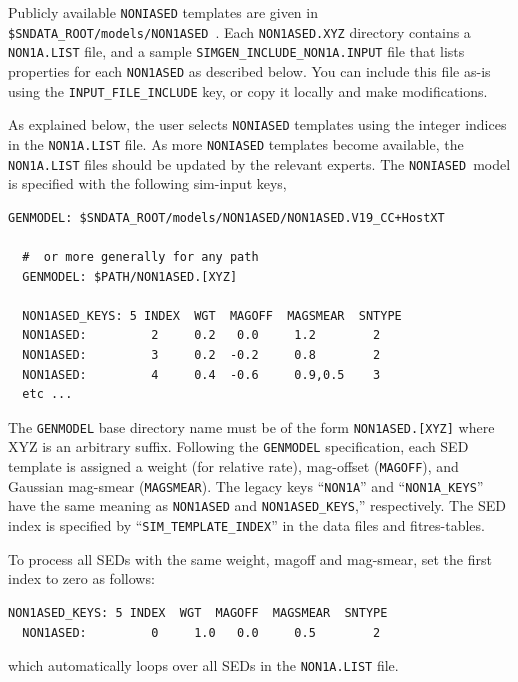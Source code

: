 \documentclass[12pt]{article}
\newcommand{\NONIA}{{\tt NONIASED}}
\begin{document}
Publicly available {\NONIA} templates are given in 
{\tt \$SNDATA\_ROOT/models/NON1ASED}~.
Each {\tt NON1ASED.XYZ} directory contains a {\tt NON1A.LIST} file,
and a sample {\tt SIMGEN\_INCLUDE\_NON1A.INPUT} file that lists
properties for each {\tt NON1ASED} as described below. 
You can include this file as-is using the
{\tt INPUT\_FILE\_INCLUDE} key, or copy it locally and make modifications.

\medskip
As explained below, the user selects {\NONIA} templates 
using the integer indices in the {\tt NON1A.LIST} file.
As more {\NONIA} templates become available, 
the {\tt NON1A.LIST} files should be updated by the relevant experts.
The \NONIA\ model is specified with the following sim-input keys,
%
\begin{Verbatim}[frame=single]
  GENMODEL: $SNDATA_ROOT/models/NON1ASED/NON1ASED.V19_CC+HostXT

  #  or more generally for any path
  GENMODEL: $PATH/NON1ASED.[XYZ]

  NON1ASED_KEYS: 5 INDEX  WGT  MAGOFF  MAGSMEAR  SNTYPE
  NON1ASED:         2     0.2   0.0     1.2        2
  NON1ASED:         3     0.2  -0.2     0.8        2
  NON1ASED:         4     0.4  -0.6     0.9,0.5    3
  etc ...
\end{Verbatim}
The {\tt GENMODEL} base directory name must be of the form {\tt NON1ASED.[XYZ]}
where XYZ is an arbitrary suffix.
Following the {\tt GENMODEL} specification, each SED template is assigned a
weight (for relative rate), mag-offset ({\tt MAGOFF}), and Gaussian mag-smear
({\tt MAGSMEAR}).
The legacy keys ``{\tt NON1A}'' and ``{\tt NON1A\_KEYS}''
have the same meaning as {\tt NON1ASED} and {\tt NON1ASED\_KEYS},''
respectively.
The SED index is specified by ``{\tt SIM\_TEMPLATE\_INDEX}'' in the data files and
fitres-tables.


To process all SEDs with the same weight, magoff and mag-smear,
set the first index to zero as follows:
\begin{Verbatim}[frame=single]
  NON1ASED_KEYS: 5 INDEX  WGT  MAGOFF  MAGSMEAR  SNTYPE
  NON1ASED:         0     1.0   0.0     0.5        2
\end{Verbatim}
%
which automatically loops over all SEDs in the {\tt NON1A.LIST} file.
\end{document}
